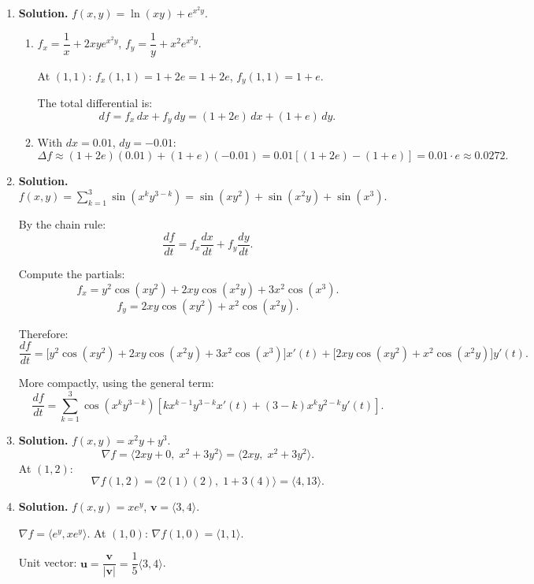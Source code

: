 \begin{enumerate}
\item \textbf{Solution.}
$f(x,y) = \ln(xy) + e^{x^2 y}$.

\begin{enumerate}
    \item $f_x = \dfrac{1}{x} + 2xye^{x^2y}$, \quad $f_y = \dfrac{1}{y} + x^2 e^{x^2y}$.

    At $(1,1)$: $f_x(1,1) = 1 + 2e = 1 + 2e$, \quad $f_y(1,1) = 1 + e$.

    The total differential is:
    \[
    df = f_x\,dx + f_y\,dy = (1 + 2e)\,dx + (1 + e)\,dy.
    \]

    \item With $dx = 0.01$, $dy = -0.01$:
    \[
    \Delta f \approx (1 + 2e)(0.01) + (1+e)(-0.01) = 0.01[(1+2e) - (1+e)] = 0.01 \cdot e \approx 0.0272.
    \]
\end{enumerate}

\item \textbf{Solution.}
$f(x,y) = \displaystyle\sum_{k=1}^{3}\sin(x^k y^{3-k}) = \sin(xy^2) + \sin(x^2y) + \sin(x^3)$.

By the chain rule:
\[
\frac{df}{dt} = f_x \frac{dx}{dt} + f_y \frac{dy}{dt}.
\]

Compute the partials:
\[
f_x = y^2\cos(xy^2) + 2xy\cos(x^2y) + 3x^2\cos(x^3).
\]
\[
f_y = 2xy\cos(xy^2) + x^2\cos(x^2y).
\]

Therefore:
\[
\frac{df}{dt} = \bigl[y^2\cos(xy^2) + 2xy\cos(x^2y) + 3x^2\cos(x^3)\bigr]x'(t) + \bigl[2xy\cos(xy^2) + x^2\cos(x^2y)\bigr]y'(t).
\]

More compactly, using the general term:
\[
\frac{df}{dt} = \sum_{k=1}^{3}\cos(x^k y^{3-k})\left[kx^{k-1}y^{3-k}x'(t) + (3-k)x^k y^{2-k}y'(t)\right].
\]


\item \textbf{Solution.}
$f(x,y) = x^2y + y^3$.
\[
\nabla f = \langle 2xy + 0,\; x^2 + 3y^2 \rangle = \langle 2xy,\; x^2 + 3y^2\rangle.
\]
At $(1,2)$:
\[
\nabla f(1,2) = \langle 2(1)(2),\; 1 + 3(4)\rangle = \boxed{\langle 4, 13\rangle}.
\]

\item \textbf{Solution.}
$f(x,y) = xe^y$, $\mathbf{v} = \langle 3, 4\rangle$.

$\nabla f = \langle e^y, xe^y\rangle$. At $(1,0)$: $\nabla f(1,0) = \langle 1, 1\rangle$.

Unit vector: $\mathbf{u} = \dfrac{\mathbf{v}}{|\mathbf{v}|} = \dfrac{1}{5}\langle 3,4\rangle$.


\end{enumerate}
